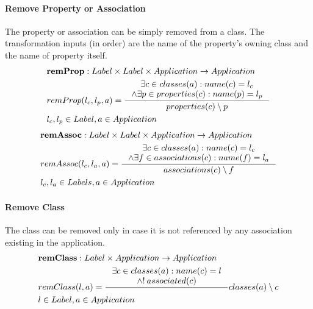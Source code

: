 \documentclass[11pt]{article}
\begin{document}
\paragraph{Remove Property or Association} The property or association can be simply removed from a class. The transformation inputs (in order) are the name of the property's owning class and the name of property itself.
\begin{align*}
&	\mathbf{remProp} : Label \times Label \times Application \rightarrow Application \\
& 	remProp(l_c, l_p, a) = \inference{\exists c \in classes(a) : name(c) = l_c \\ \wedge \exists p \in properties(c) : name(p) = l_p
	}{properties(c) \setminus p }\\
&	l_c, l_p \in Label, a \in Application 
\end{align*}
\begin{align*}
&	\mathbf{remAssoc} : Label \times Label \times Application \rightarrow Application \\
&	remAssoc(l_c, l_a, a) = \inference{\exists c \in classes(a) : name(c) = l_c \\ \wedge \exists f \in associations(c) : name(f) = l_a }{associations(c) \setminus f} \\
&	l_c, l_a \in Labels, a \in Application
\end{align*}

\paragraph{Remove Class} The class can be removed only in case it is not referenced by any association existing in the application.
\begin{align*}
&	\mathbf{remClass} : Label \times Application \rightarrow Application \\
&	remClass(l, a) = \inference{\exists c \in classes(a) : name(c) = l \\ \wedge !\: associated(c)
	} {classes(a) \setminus c }\\
&	l \in Label,a \in Application
\end{align*}
\end{document}
